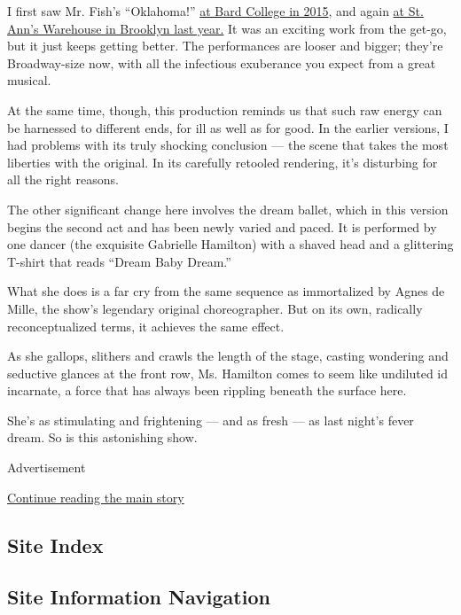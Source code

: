 I first saw Mr. Fish's ``Oklahoma!''
\href{https://www.nytimes3xbfgragh.onion/2015/07/07/theater/review-oklahoma-preserves-a-classic-while-adding-punch.html}{at
Bard College in 2015}, and again
\href{https://www.nytimes3xbfgragh.onion/2018/10/07/theater/oklahoma-review.html}{at
St. Ann's Warehouse in Brooklyn last year.} It was an exciting work from
the get-go, but it just keeps getting better. The performances are
looser and bigger; they're Broadway-size now, with all the infectious
exuberance you expect from a great musical.

At the same time, though, this production reminds us that such raw
energy can be harnessed to different ends, for ill as well as for good.
In the earlier versions, I had problems with its truly shocking
conclusion --- the scene that takes the most liberties with the
original. In its carefully retooled rendering, it's disturbing for all
the right reasons.

The other significant change here involves the dream ballet, which in
this version begins the second act and has been newly varied and paced.
It is performed by one dancer (the exquisite Gabrielle Hamilton) with a
shaved head and a glittering T-shirt that reads ``Dream Baby Dream.''

What she does is a far cry from the same sequence as immortalized by
Agnes de Mille, the show's legendary original choreographer. But on its
own, radically reconceptualized terms, it achieves the same effect.

As she gallops, slithers and crawls the length of the stage, casting
wondering and seductive glances at the front row, Ms. Hamilton comes to
seem like undiluted id incarnate, a force that has always been rippling
beneath the surface here.

She's as stimulating and frightening --- and as fresh --- as last
night's fever dream. So is this astonishing show.

Advertisement

\protect\hyperlink{after-bottom}{Continue reading the main story}

\hypertarget{site-index}{%
\subsection{Site Index}\label{site-index}}

\hypertarget{site-information-navigation}{%
\subsection{Site Information
Navigation}\label{site-information-navigation}}

